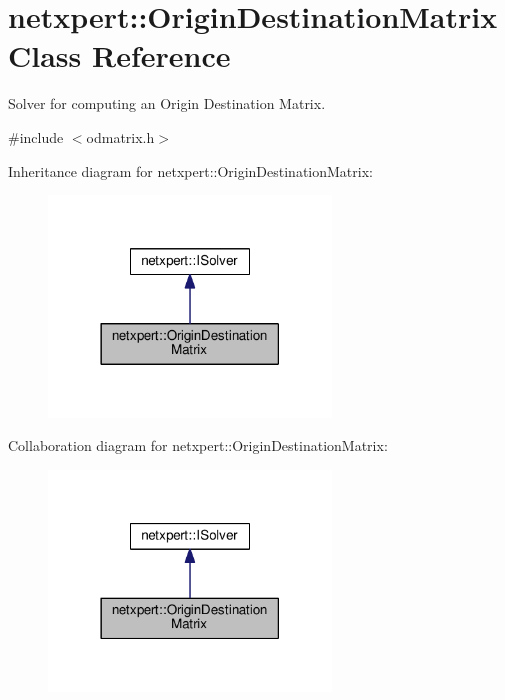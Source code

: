 \hypertarget{classnetxpert_1_1OriginDestinationMatrix}{}\section{netxpert\+:\+:Origin\+Destination\+Matrix Class Reference}
\label{classnetxpert_1_1OriginDestinationMatrix}


Solver for computing an Origin Destination Matrix.  




{\ttfamily \#include $<$odmatrix.\+h$>$}



Inheritance diagram for netxpert\+:\+:Origin\+Destination\+Matrix\+:\nopagebreak
\begin{figure}[H]
\begin{center}
\leavevmode
\includegraphics[width=213pt]{classnetxpert_1_1OriginDestinationMatrix__inherit__graph}
\end{center}
\end{figure}


Collaboration diagram for netxpert\+:\+:Origin\+Destination\+Matrix\+:\nopagebreak
\begin{figure}[H]
\begin{center}
\leavevmode
\includegraphics[width=213pt]{classnetxpert_1_1OriginDestinationMatrix__coll__graph}
\end{center}
\end{figure}
